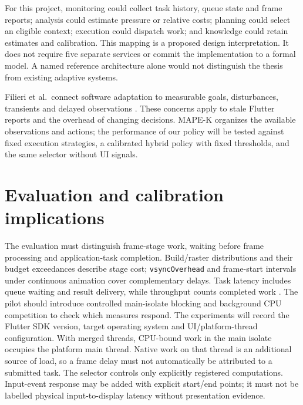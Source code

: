 \documentclass[14pt,a4paper,oneside]{extreport}
\begin{document}
For this project, monitoring could collect task history, queue state and frame reports;
analysis could estimate pressure or relative costs; planning could select an eligible context;
execution could dispatch work; and knowledge could retain estimates and calibration. This
mapping is a proposed design interpretation. It does not require five separate services or
commit the implementation to a formal model. A named reference architecture alone would not
distinguish the thesis from existing adaptive systems.

Filieri et al.~connect software adaptation to measurable goals, disturbances, transients and
delayed observations \citep{filieri2015}. These concerns apply to stale Flutter reports and
the overhead of changing decisions. MAPE-K organizes the available observations and actions;
the performance of our policy will be tested against fixed execution strategies, a calibrated
hybrid policy with fixed thresholds, and the same selector without UI signals.

\section{Evaluation and calibration implications}
\label{evaluation-and-calibration-implications}

The evaluation must distinguish frame-stage work, waiting before frame processing and
application-task completion. Build/raster distributions and their budget exceedances describe
stage cost; \texttt{vsyncOverhead} and frame-start intervals under continuous animation cover
complementary delays. Task latency includes queue waiting and result delivery, while
throughput counts completed work \citep{flutter-frame, flutter-vsync, iaware2023}. The pilot
should introduce controlled main-isolate blocking and background CPU competition to check
which measures respond. The experiments will record the Flutter SDK version, target
operating system and UI/platform-thread configuration. With merged threads, CPU-bound work
in the main isolate occupies the platform main thread. Native work on that thread is an
additional source of load, so a frame delay must not automatically be attributed to a
submitted task. The selector controls only explicitly registered computations. Input-event response may be added with explicit start/end points; it
must not be labelled physical input-to-display latency without presentation evidence.
\end{document}
